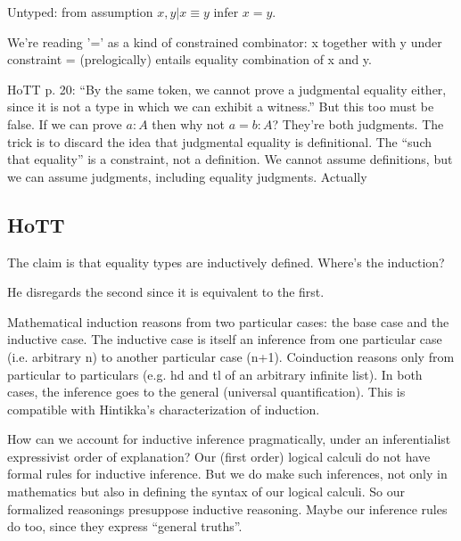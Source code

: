 \documentclass{article}
\begin{document}
Untyped:  from assumption \(x, y | x≡y \) infer \(x = y\).

We're reading '=' as a kind of constrained combinator: x together with
y under constraint = (prelogically) entails equality combination of x
and y.

HoTT p. 20: ``By the same token, we cannot prove a judgmental equality
either, since it is not a type in which we can exhibit a witness.''
But this too must be false. If we can prove \(a:A\) then why not
\(a=b:A\)? They're both judgments. The trick is to discard the idea
that judgmental equality is definitional. The ``such that equality''
is a constraint, not a definition. We cannot assume definitions, but
we can assume judgments, including equality judgments. Actually


\subsection{HoTT}

The claim is that equality types are inductively defined. Where's the
induction?


He disregards the second since it is equivalent to the first.

Mathematical induction reasons from two particular cases: the base
case and the inductive case. The inductive case is itself an inference
from one particular case (i.e. arbitrary n) to another particular case
(n+1). Coinduction reasons only from particular to particulars (e.g.
hd and tl of an arbitrary infinite list). In both cases, the inference
goes to the general (universal quantification). This is compatible
with Hintikka's characterization of induction.

How can we account for inductive inference pragmatically, under an
inferentialist expressivist order of explanation? Our (first order)
logical calculi do not have formal rules for inductive inference. But
we do make such inferences, not only in mathematics but also in
defining the syntax of our logical calculi. So our formalized
reasonings presuppose inductive reasoning. Maybe our inference rules
do too, since they express ``general truths''.
\end{document}
